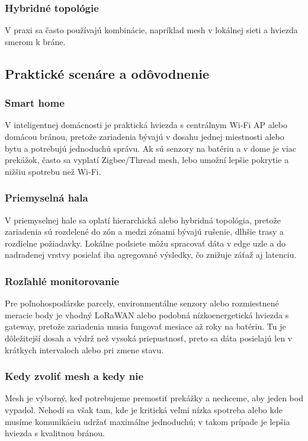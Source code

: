 \subsubsection*{Hybridné topológie}
V praxi sa často používajú kombinácie, napríklad mesh v lokálnej sieti a hviezda smerom k bráne.

\subsection{Praktické scenáre a odôvodnenie}
\subsubsection*{Smart home}
V inteligentnej domácnosti je praktická hviezda s centrálnym Wi‑Fi AP alebo domácou bránou, pretože zariadenia bývajú v dosahu jednej miestnosti alebo bytu a potrebujú jednoduchú správu. Ak sú senzory na batériu a v dome je viac prekážok, často sa vyplatí Zigbee/Thread mesh, lebo umožní lepšie pokrytie a nižšiu spotrebu než Wi‑Fi.

\subsubsection*{Priemyselná hala}
V priemyselnej hale sa oplatí hierarchická alebo hybridná topológia, pretože zariadenia sú rozdelené do zón a medzi zónami bývajú rušenie, dlhšie trasy a rozdielne požiadavky. Lokálne podsiete môžu spracovať dáta v edge uzle a do nadradenej vrstvy posielať iba agregované výsledky, čo znižuje záťaž aj latenciu.

\subsubsection*{Rozľahlé monitorovanie}
Pre poľnohospodárske parcely, environmentálne senzory alebo rozmiestnené meracie body je vhodný LoRaWAN alebo podobná nízkoenergetická hviezda s gateway, pretože zariadenia musia fungovať mesiace až roky na batériu. Tu je dôležitejší dosah a výdrž než vysoká priepustnosť, preto sa dáta posielajú len v krátkych intervaloch alebo pri zmene stavu.

\subsubsection*{Kedy zvoliť mesh a kedy nie}
Mesh je výborný, keď potrebujeme premostiť prekážky a nechceme, aby jeden bod vypadol. Nehodí sa však tam, kde je kritická veľmi nízka spotreba alebo kde musíme komunikáciu udržať maximálne jednoduchú; v takom prípade je lepšia hviezda s kvalitnou bránou.

